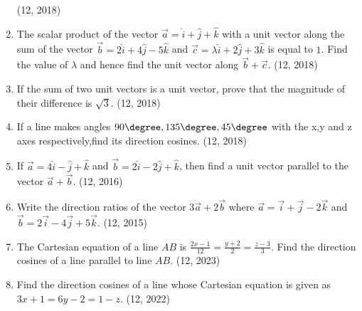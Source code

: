 \begin{enumerate}[label=\thesubsection.\arabic*,  ref=\thesubsection.\theenumi]
\hfill (12, 2018)
\item The scalar product of the vector $\overrightarrow{a} = \hat{i} + \hat{j} + \hat{k}$ with a unit vector along the sum of the vector $\overrightarrow{b} = 2\hat{i} + 4\hat{j} - 5\hat{k}$ and $\overrightarrow{c} = \lambda \hat{i} + 2\hat{j} + 3\hat{k}$ is equal to $1$. Find the value of $\lambda$ and hence find the unit vector along $\overrightarrow{b} + \overrightarrow{c}$.
\hfill (12, 2018) 
\item If the sum of two unit vectors is a unit vector, prove that the magnitude of their difference is $\sqrt{3}$.
\hfill (12, 2018) 
\item If a line makes angles $ 90\degree,135\degree,45\degree$ with the x,y and z axes respectively,find its direction cosines.
\hfill (12, 2018) 
\item If $\overrightarrow{a} = 4\hat{i} - \hat{j} +\hat{k}$ and $\overrightarrow{b} = 2\hat{i} - 2\hat{j} + \hat{k}$, then find a unit vector parallel to the vector $\overrightarrow{a}+\overrightarrow{b}$. \hfill (12, 2016)
\item Write the direction ratios of the vector $3\vec{a}+2\vec{b}$ where $\vec{a} = \overrightarrow{i}+\overrightarrow{j}-2\overrightarrow{k}$ and $\vec{b} = 2\overrightarrow{i}-4\overrightarrow{j}+5\overrightarrow{k}$.
	\hfill (12, 2015)
    \item The Cartesian equation of a line $AB$ is
        $\frac{2x - 1}{12} = \frac{y + 2}{2} = \frac{z - 3}{3}$.
Find the direction cosines of a line parallel to line $AB$.
    \hfill (12, 2023)
    \item Find the direction cosines of a line whose Cartesian equation is given as
        $3x + 1 = 6y - 2 = 1 - z$.
    \hfill (12, 2022)
\end{enumerate}

